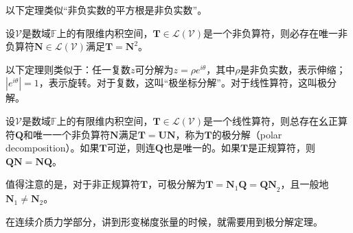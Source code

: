\documentclass[main.tex]{subfiles}
\begin{document}
以下定理类似“非负实数的平方根是非负实数”。

\begin{theorem}\label{thm:II.2.36}
    设$\mathcal{V}$是数域$\mathbb{F}$上的有限维内积空间，$\mathbf{T}\in\mathcal{L}\left(\mathcal{V}\right)$是一个非负算符，则必存在唯一非负算符$\mathbf{N}\in\mathcal{L}\left(\mathcal{V}\right)$满足$\mathbf{T}=\mathbf{N}^2$。
\end{theorem}

以下定理则类似于：任一复数$z$可分解为$z=\rho e^{i\theta}$，其中$\rho$是非负实数，表示伸缩；$\left|e^{i\theta}\right|=1$，表示旋转。对于复数，这叫“极坐标分解”。对于线性算符，这叫极分解。

\begin{theorem}[极分解]\label{thm:II.2.37}
    设$\mathcal{V}$是数域$\mathbb{F}$上的有限维内积空间，$\mathbf{T}\in\mathcal{L}\left(\mathcal{V}\right)$是一个线性算符，则总存在幺正算符$\mathbf{Q}$和唯一一个非负算符$\mathbf{N}$满足$\mathbf{T}=\mathbf{UN}$，称为$\mathbf{T}$的极分解（polar decomposition）。如果$\mathbf{T}$可逆，则连$\mathbf{Q}$也是唯一的。如果$\mathbf{T}$是正规算符，则$\mathbf{QN}=\mathbf{NQ}$。
\end{theorem}

值得注意的是，对于非正规算符$\mathbf{T}$，可极分解为$\mathbf{T}=\mathbf{N}_1\mathbf{Q}=\mathbf{QN}_2$，且一般地$\mathbf{N}_1\neq\mathbf{N}_2$。

在连续介质力学部分，讲到形变梯度张量的时候，就需要用到极分解定理。
\end{document}
